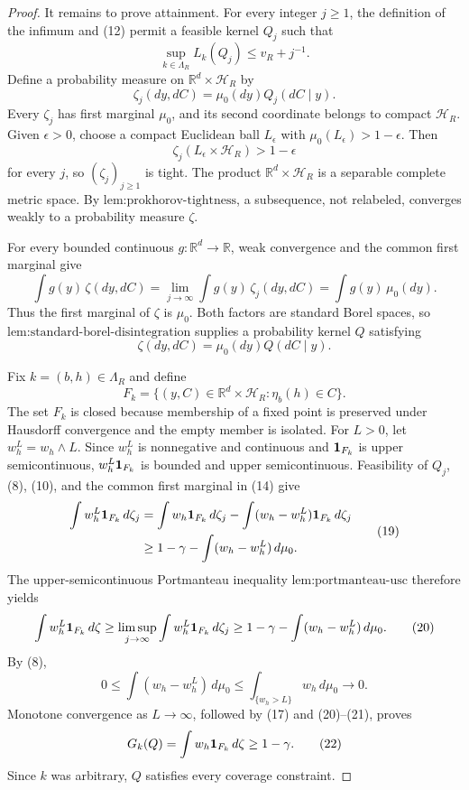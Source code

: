 \documentclass{article}
\begin{document}
\begin{proof}
It remains to prove attainment.  For every integer \(j\ge1\), the definition of the infimum and (12) permit a feasible kernel \(Q_j\) such that
\[
 \sup_{k\in\Lambda_R}L_k(Q_j)\le v_R+j^{-1}.
\tag{13}
\]
Define a probability measure on \(\mathbb R^d\times\mathcal H_R\) by
\[
 \zeta_j(dy,dC)=\mu_0(dy)Q_j(dC\mid y).
\tag{14}
\]
Every \(\zeta_j\) has first marginal \(\mu_0\), and its second coordinate belongs to compact \(\mathcal H_R\).  Given \(\epsilon>0\), choose a compact Euclidean ball \(L_\epsilon\) with \(\mu_0(L_\epsilon)>1-\epsilon\).  Then
\[
 \zeta_j(L_\epsilon\times\mathcal H_R)>1-\epsilon
\tag{15}
\]
for every \(j\), so \((\zeta_j)_{j\ge1}\) is tight.  The product \(\mathbb R^d\times\mathcal H_R\) is a separable complete metric space.  By \(\text{lem:prokhorov-tightness}\), a subsequence, not relabeled, converges weakly to a probability measure \(\zeta\).

For every bounded continuous \(g:\mathbb R^d\to\mathbb R\), weak convergence and the common first marginal give
\[
 \int g(y)\,\zeta(dy,dC)
 =\lim_{j\to\infty}\int g(y)\,\zeta_j(dy,dC)
 =\int g(y)\,\mu_0(dy).
\tag{16}
\]
Thus the first marginal of \(\zeta\) is \(\mu_0\).  Both factors are standard Borel spaces, so \(\text{lem:standard-borel-disintegration}\) supplies a probability kernel \(Q\) satisfying
\[
 \zeta(dy,dC)=\mu_0(dy)Q(dC\mid y).
\tag{17}
\]

Fix \(k=(b,h)\in\Lambda_R\) and define
\[
 F_k=\{(y,C)\in\mathbb R^d\times\mathcal H_R:\eta_b(h)\in C\}.
\tag{18}
\]
The set \(F_k\) is closed because membership of a fixed point is preserved under Hausdorff convergence and the empty member is isolated.  For \(L>0\), let \(w_h^L=w_h\wedge L\).  Since \(w_h^L\) is nonnegative and continuous and \({\bf1}_{F_k}\) is upper semicontinuous, \(w_h^L{\bf1}_{F_k}\) is bounded and upper semicontinuous.  Feasibility of \(Q_j\), (8), (10), and the common first marginal in (14) give
\[
\begin{aligned}
 \int w_h^L{\bf1}_{F_k}\,d\zeta_j
 &=\int w_h{\bf1}_{F_k}\,d\zeta_j
   -\int(w_h-w_h^L){\bf1}_{F_k}\,d\zeta_j\\
 &\ge1-\gamma-\int(w_h-w_h^L)\,d\mu_0.
\end{aligned}
\tag{19}
\]
The upper-semicontinuous Portmanteau inequality \(\text{lem:portmanteau-usc}\) therefore yields
\[
 \int w_h^L{\bf1}_{F_k}\,d\zeta
 \ge\limsup_{j\to\infty}\int w_h^L{\bf1}_{F_k}\,d\zeta_j
 \ge1-\gamma-\int(w_h-w_h^L)\,d\mu_0.
\tag{20}
\]
By (8),
\[
 0\le\int(w_h-w_h^L)\,d\mu_0
 \le\int_{\{w_h>L\}}w_h\,d\mu_0\longrightarrow0.
\tag{21}
\]
Monotone convergence as \(L\to\infty\), followed by (17) and (20)--(21), proves
\[
 G_k(Q)=\int w_h{\bf1}_{F_k}\,d\zeta\ge1-\gamma.
\tag{22}
\]
Since \(k\) was arbitrary, \(Q\) satisfies every coverage constraint.


\end{proof}
\end{document}
